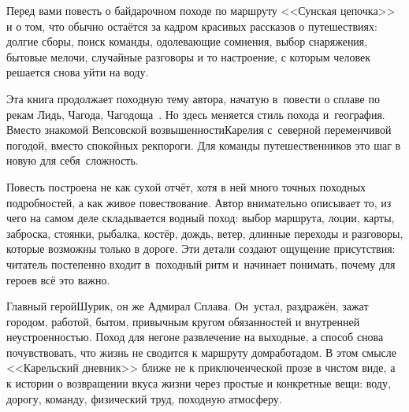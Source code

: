
\clearpage               %
\thispagestyle{plain}   %


{\small%
\vspace{9mm}
\setlength{\parskip}{2mm}
\setlength{\parindent}{1.0cm}
Перед вами повесть о байдарочном походе по маршруту <<Сунская цепочка>> и о том, что обычно остаётся за кадром красивых рассказов о путешествиях: долгие сборы, поиск команды, одолевающие сомнения, выбор снаряжения, бытовые мелочи, случайные разговоры и то настроение, с которым человек решается снова уйти на воду.

Эта книга продолжает походную тему автора, начатую в~повести о сплаве по рекам Лидь, Чагода, Чагодоща~\mbox{\cite{СоболевЛидьЧагодаЧагодоща}}. Но здесь меняется стиль похода и~география. Вместо знакомой Вепсовской возвышенности\mdash Карелия с~северной переменчивой погодой, вместо спокойных рек\mdash пороги. Для команды путешественников это шаг в новую для себя~сложность. 

Повесть построена не как сухой отчёт, хотя в ней много точных походных подробностей, а как живое повествование. Автор внимательно описывает то, из чего на самом деле складывается водный поход: выбор маршрута, лоции, карты, заброска, стоянки, рыбалка, костёр, дождь, ветер, длинные переходы и разговоры, которые возможны только в дороге. Эти детали создают ощущение присутствия: читатель постепенно входит в~походный ритм и~начинает понимать, почему для героев всё это важно.

Главный герой\mdash Шурик, он же Адмирал Сплава. Он~устал, раздражён, зажат городом, работой, бытом, привычным кругом обязанностей и внутренней неустроенностью. Поход для него\mdash не развлечение на выходные, а способ снова почувствовать, что жизнь не сводится к маршруту дом\mdash работа\mdash дом. В этом смысле <<Карельский дневник>> ближе не к приключенческой прозе в чистом виде, а к истории о возвращении вкуса жизни через простые и конкретные вещи: воду, дорогу, команду, физический труд, походную атмосферу.

}

